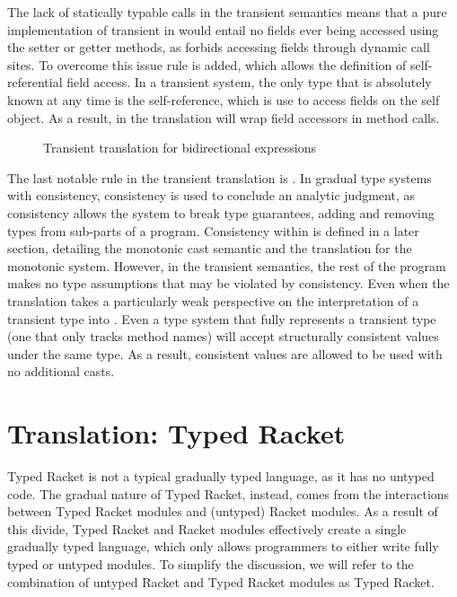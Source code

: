 \documentclass[a4paper,USenglish]{tex/lipics-v2016}
\begin{document}
The lack of statically typable calls in the transient semantics means that a
pure implementation of transient in  \kafka would entail no fields ever being
accessed using the setter or getter methods, as \kafka forbids accessing fields through
dynamic call sites. To overcome this issue rule  is added, which
allows the definition of self-referential field access. In a transient  system,
the only type that is absolutely known at any time is the self-reference, which
is use to access fields on the  self object. As a result, in \kafka the
translation will wrap field accessors in method calls.

\begin{figure}
\begin{mathpar}

\end{mathpar}
\caption{Transient translation for bidirectional expressions}
\label{fig:tratrans_exp2}
\end{figure}

The last notable rule in the transient translation is . In gradual type systems with consistency, 
consistency is used to conclude an analytic judgment, as consistency allows the system to break type guarantees, adding and removing types from sub-parts of a program.
Consistency within \kafka is defined in a later section, detailing the monotonic cast semantic and the translation for the monotonic system.   
However, in the transient semantics, the rest of the program makes no type assumptions that may be violated by consistency. Even when the 
translation takes a particularly weak perspective on the interpretation of a transient type into \kafka. Even a type system that
fully represents a transient type (one that only tracks  method names) will accept structurally consistent values under the 
same type. As a result, consistent values are allowed to be used with no additional casts.

\section{Translation: Typed Racket}

Typed Racket is not a typical gradually typed language, as it has no untyped
code. The gradual nature of Typed Racket, instead, comes from the interactions
between Typed Racket modules and  (untyped) Racket modules. As a result of this
divide, Typed Racket and Racket modules effectively create a single gradually
typed language, which only allows programmers to either write fully typed or
untyped modules. To simplify the discussion, we will refer to the combination of
untyped Racket and Typed Racket modules as Typed Racket.
\end{document}
